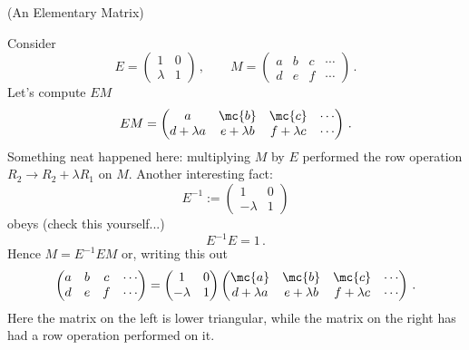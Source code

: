 \begin{example} (An Elementary Matrix)

\noindent
Consider \[E=\begin{pmatrix}1&0\\\lambda&1\end{pmatrix}\, ,\qquad M=\begin{pmatrix}a&b&c&\cdots\\d&e&f&\cdots\end{pmatrix}\, .\]
Let's compute $EM$
\[
EM=\begin{pmatrix}\multicolumn{1}{c}{a}&\mc{b}&\mc{c}&\cdots\\d+\lambda a&e+\lambda b&f+\lambda c&\cdots\end{pmatrix}\, .
\]
Something neat happened here: multiplying $M$ by $E$ performed the row operation $R_2\to R_2+\lambda R_1$ on $M$.
Another interesting fact:
\[
E^{-1}:=\begin{pmatrix}1&0\\-\lambda&1\end{pmatrix}
\] 
obeys (check this yourself...)
\[
E^{-1} E = 1\, .
\]
Hence $M=E^{-1} E M$ or, writing this out
\[
\begin{pmatrix}a&b&c&\cdots\\d&e&f&\cdots\end{pmatrix}=\begin{pmatrix}1&0\\-\lambda&1\end{pmatrix} \begin{pmatrix}\mc{a}&\mc{b}&\mc{c}&\cdots\\d+\lambda a&e+\lambda b&f+\lambda c&\cdots\end{pmatrix}\, .
\]
Here the matrix on the left is lower triangular, while the matrix on the right has had a row operation performed on it.
\end{example}




